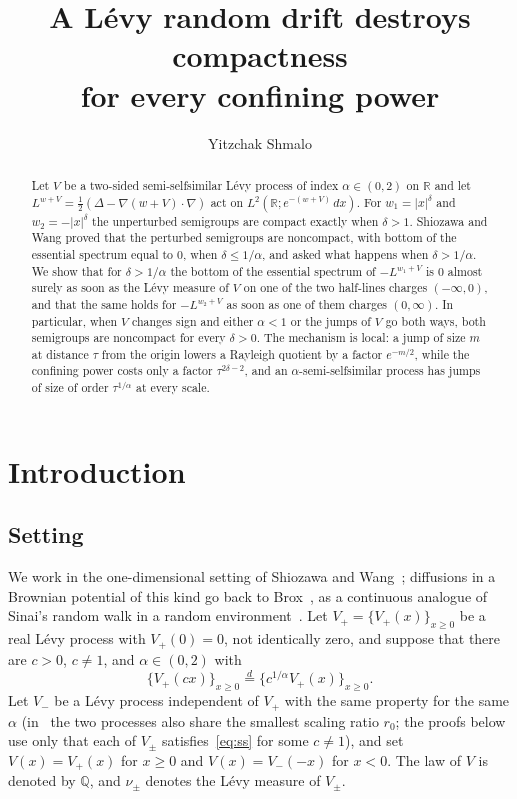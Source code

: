 \documentclass[11pt]{amsart}
\title[Random drift destroys compactness for every power]{A L\'evy random drift destroys compactness\\ for every confining power}
\author{Yitzchak Shmalo}
\theoremstyle{remark}
\newcommand{\R}{\mathbb R}
\newcommand{\Q}{\mathbb Q}
\begin{document}
\begin{abstract}
Let $V$ be a two-sided semi-selfsimilar L\'evy process of index $\alpha\in(0,2)$ on $\R$ and let $L^{w+V}=\frac12(\Delta-\nabla(w+V)\cdot\nabla)$ act on $L^2(\R;e^{-(w+V)}\,dx)$. For $w_1=|x|^\delta$ and $w_2=-|x|^\delta$ the unperturbed semigroups are compact exactly when $\delta>1$. Shiozawa and Wang proved that the perturbed semigroups are noncompact, with bottom of the essential spectrum equal to $0$, when $\delta\le 1/\alpha$, and asked what happens when $\delta>1/\alpha$. We show that for $\delta>1/\alpha$ the bottom of the essential spectrum of $-L^{w_1+V}$ is $0$ almost surely as soon as the L\'evy measure of $V$ on one of the two half-lines charges $(-\infty,0)$, and that the same holds for $-L^{w_2+V}$ as soon as one of them charges $(0,\infty)$. In particular, when $V$ changes sign and either $\alpha<1$ or the jumps of $V$ go both ways, both semigroups are noncompact for every $\delta>0$. The mechanism is local: a jump of size $m$ at distance $\tau$ from the origin lowers a Rayleigh quotient by a factor $e^{-m/2}$, while the confining power costs only a factor $\tau^{2\delta-2}$, and an $\alpha$-semi-selfsimilar process has jumps of size of order $\tau^{1/\alpha}$ at every scale.
\end{abstract}

\maketitle

\section{Introduction}

\subsection*{Setting}
We work in the one-dimensional setting of Shiozawa and Wang~\cite[Sections~4.1 and~5]{SW}; diffusions in a Brownian potential of this kind go back to Brox~\cite{Brox}, as a continuous analogue of Sinai's random walk in a random environment~\cite{Sinai}. Let $V_+=\{V_+(x)\}_{x\ge0}$ be a real L\'evy process with $V_+(0)=0$, not identically zero, and suppose that there are $c>0$, $c\ne1$, and $\alpha\in(0,2)$ with
\begin{equation}\label{eq:ss}
\{V_+(cx)\}_{x\ge0}\overset{d}{=}\{c^{1/\alpha}V_+(x)\}_{x\ge0}.
\end{equation}
Let $V_-$ be a L\'evy process independent of $V_+$ with the same property for the same $\alpha$ (in~\cite{SW} the two processes also share the smallest scaling ratio $r_0$; the proofs below use only that each of $V_\pm$ satisfies~\eqref{eq:ss} for some $c\ne1$), and set $V(x)=V_+(x)$ for $x\ge0$ and $V(x)=V_-(-x)$ for $x<0$. The law of $V$ is denoted by $\Q$, and $\nu_\pm$ denotes the L\'evy measure of $V_\pm$.
\end{document}
